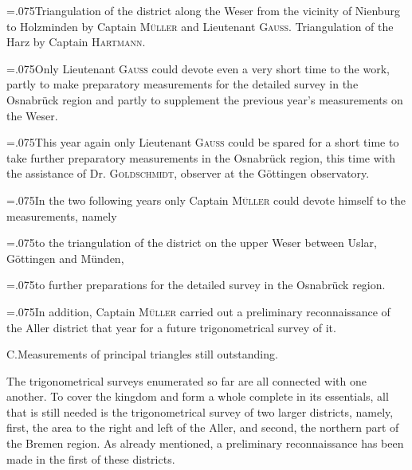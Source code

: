 {\hangindent=.075\linewidth{}\noindent{}\enspace Triangulation of the district along the Weser from the vicinity of Nienburg to Holzminden by Captain \textsc{Müller} and Lieutenant \textsc{Gauss}. Triangulation of the Harz by Captain \textsc{Hartmann}.\par}

{\hangindent=.075\linewidth{}\noindent{}Only Lieutenant \textsc{Gauss} could devote even a very short time to the work, partly to make preparatory measurements for the detailed survey in the Osnabrück region and partly to supplement the previous year's measurements on the Weser.\par}

{\hangindent=.075\linewidth{}\noindent{}\enspace This year again only Lieutenant \textsc{Gauss} could be spared for a short time to take further preparatory measurements in the Osnabrück region, this time with the assistance of Dr. \textsc{Goldschmidt}, observer at the Göttingen observatory.\par}

{\leftskip=.075\linewidth\noindent In the two following years only Captain \textsc{Müller} could devote himself to the measurements, namely\par}

{\hangindent=.075\linewidth{}\noindent{}to the triangulation of the district on the upper Weser between Uslar, Göttingen and Münden,\par}

{\hangindent=.075\linewidth{}\noindent{}to further preparations for the detailed survey in the Osnabrück region.\par}

{\leftskip=.075\linewidth\noindent In addition, Captain \textsc{Müller} carried out a preliminary reconnaissance of the Aller district that year for a future trigonometrical survey of it.\par}

\begin{center}
C.\quad Measurements of principal triangles still outstanding.
\end{center}

\par\noindent\hspace*{\parindent}The trigonometrical surveys enumerated so far are all connected with one another. To cover the  kingdom and form a whole complete in its essentials, all that is still needed is the trigonometrical survey of two larger districts, namely, first, the area to the right and left of the Aller, and second, the northern part of the Bremen region. As already mentioned, a preliminary reconnaissance has been made in the first of these districts.

